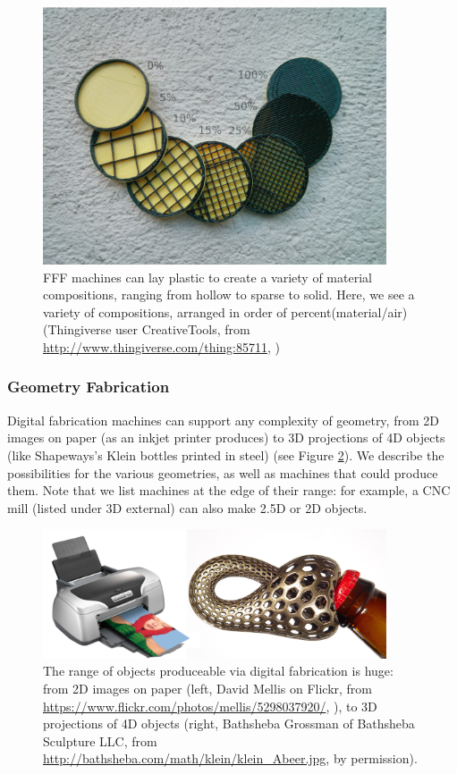 \begin{figure}
\centering
\includegraphics[width=4in]{figures/infills.jpg}
\caption{FFF machines can lay plastic to create a variety of material compositions, ranging from hollow to sparse to solid. Here, we see a variety of compositions, arranged in order of percent(material/air) (Thingiverse user CreativeTools, from \url{http://www.thingiverse.com/thing:85711}, \ccby)}
\label{fig:composition}
\end{figure}

\subsubsection{Geometry Fabrication}

Digital fabrication machines can support any complexity of geometry, from 2D images on paper (as an inkjet printer produces) to 3D projections of 4D objects (like Shapeways's Klein bottles printed in steel) (see Figure \ref{fig:range}). We describe the possibilities for the various geometries, as well as machines that could produce them. Note that we list machines at the edge of their range: for example, a CNC mill (listed under 3D external) can also make 2.5D or 2D objects.

\begin{figure}
\centering
\includegraphics[width=4in]{figures/range.png}
\caption{The range of objects produceable via digital fabrication is huge: from 2D images on paper (left, David Mellis on Flickr, from \url{https://www.flickr.com/photos/mellis/5298037920/}, \ccby), to 3D projections of 4D objects (right, Bathsheba Grossman of Bathsheba Sculpture LLC, from \url{http://bathsheba.com/math/klein/klein_Abeer.jpg}, by permission).}
\label{fig:range}
\end{figure}

